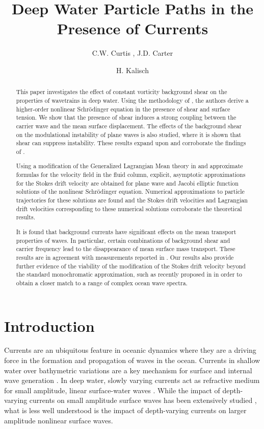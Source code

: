 \documentclass{JFM_Style/jfm}
\title{Deep Water Particle Paths in the Presence of Currents}
\date{}
\author{C.W. Curtis \aff{1}
  \corresp{\email{ccurtis@mail.sdsu.edu}}, J.D. Carter\aff{2} \and H. Kalisch\aff{3}}
\affiliation{\aff{1}Department of Mathematics and Statistics, San Diego State University, San Diego, CA 92182
\aff{2}Mathematics Department, Seattle University, Seattle, WA 98122
\aff{3}Department of Mathematics, University of Bergen, Bergen, Norway
}
\begin{document}
\maketitle

\begin{abstract}
This paper investigates the effect of constant vorticity background shear on the properties of wavetrains in deep water. Using the methodology of \cite{fokas2008},
the authors derive a higher-order nonlinear Schr\"{o}dinger equation in the presence of shear and surface tension.  We show that the presence of shear induces a strong coupling between the carrier wave and the mean surface displacement.  The effects of the background shear on the modulational instability of plane waves is also studied, where it is shown that shear can suppress instability.  These results expand upon and corroborate the findings of \cite{thomas2012nonlinear}.

Using a modification of the Generalized Lagrangian Mean theory in  \cite{andrews} and approximate formulas for the velocity field in the fluid column, explicit, asymptotic approximations for the Stokes drift velocity are obtained for plane wave and Jacobi elliptic function solutions of the nonlinear Schr\"odinger equation.  Numerical approximations to particle trajectories for these solutions are found and the Stokes drift velocities and Lagrangian drift velocities corresponding to these numerical solutions corroborate the theoretical results.  

It is found that background currents have significant effects on the mean transport properties of waves. In particular, certain combinations of background shear and carrier frequency lead to the disappearance of mean surface mass transport.  These results
are in agreement with measurements reported in \cite{smith}.  Our results also provide further evidence of the viability of the modification of the Stokes drift velocity beyond the standard monochromatic approximation, such as recently proposed in \cite{breivik} in order to obtain a closer match to a range of complex ocean wave spectra.
\end{abstract}

\section{Introduction}

Currents are an ubiquitous feature in oceanic dynamics where they are a driving force in the formation and propagation of waves in the ocean.  Currents in shallow water over bathymetric variations are a key mechanism for surface and internal wave generation \cite{helfrich}.  In deep water, slowly varying currents act as refractive medium for small amplitude, linear surface-water waves \cite{young}.  While the impact of depth-varying currents on small amplitude surface waves has been extensively studied \cite{craik1,craik2,craik3,craik4,phillips1,phillips2}, what is less well understood is the impact of depth-varying currents on larger amplitude nonlinear surface waves. 
\end{document}
